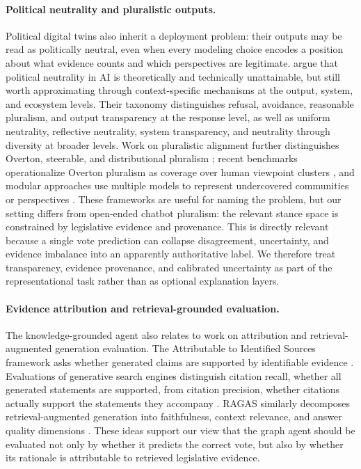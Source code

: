 \documentclass[letterpaper]{article}
\begin{document}
\paragraph{Political neutrality and pluralistic outputs.}
Political digital twins also inherit a deployment problem: their outputs may be read as politically neutral, even when every modeling choice encodes a position about what evidence counts and which perspectives are legitimate. \citet{fisher2025politicalNeutrality} argue that political neutrality in AI is theoretically and technically unattainable, but still worth approximating through context-specific mechanisms at the output, system, and ecosystem levels. Their taxonomy distinguishes refusal, avoidance, reasonable pluralism, and output transparency at the response level, as well as uniform neutrality, reflective neutrality, system transparency, and neutrality through diversity at broader levels. Work on pluralistic alignment further distinguishes Overton, steerable, and distributional pluralism \citep{sorensen2024roadmapPluralisticAlignment}; recent benchmarks operationalize Overton pluralism as coverage over human viewpoint clusters \citep{pooleDayan2026benchmarkingOvertonPluralism}, and modular approaches use multiple models to represent undercovered communities or perspectives \citep{feng2024modularPluralism}. These frameworks are useful for naming the problem, but our setting differs from open-ended chatbot pluralism: the relevant stance space is constrained by legislative evidence and provenance. This is directly relevant because a single vote prediction can collapse disagreement, uncertainty, and evidence imbalance into an apparently authoritative label. We therefore treat transparency, evidence provenance, and calibrated uncertainty as part of the representational task rather than as optional explanation layers.

\paragraph{Evidence attribution and retrieval-grounded evaluation.}
The knowledge-grounded agent also relates to work on attribution and retrieval-augmented generation evaluation. The Attributable to Identified Sources framework asks whether generated claims are supported by identifiable evidence \citep{rashkin2022measuringAttribution}. Evaluations of generative search engines distinguish citation recall, whether all generated statements are supported, from citation precision, whether citations actually support the statements they accompany \citep{liu2023evaluatingVerifiability}. RAGAS similarly decomposes retrieval-augmented generation into faithfulness, context relevance, and answer quality dimensions \citep{es2025ragasEvaluation}. These ideas support our view that the graph agent should be evaluated not only by whether it predicts the correct vote, but also by whether its rationale is attributable to retrieved legislative evidence.
\end{document}
